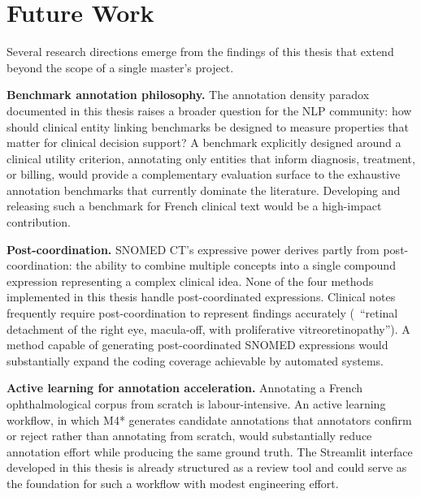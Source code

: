 \section{Future Work}

Several research directions emerge from the findings of this thesis that extend beyond the scope of a single master's project.

\textbf{Benchmark annotation philosophy.} The annotation density paradox documented in this thesis raises a broader question for the NLP community: how should clinical entity linking benchmarks be designed to measure properties that matter for clinical decision support? A benchmark explicitly designed around a clinical utility criterion, annotating only entities that inform diagnosis, treatment, or billing, would provide a complementary evaluation surface to the exhaustive annotation benchmarks that currently dominate the literature. Developing and releasing such a benchmark for French clinical text would be a high-impact contribution.

\textbf{Post-coordination.} SNOMED CT's expressive power derives partly from post-coordination: the ability to combine multiple concepts into a single compound expression representing a complex clinical idea. None of the four methods implemented in this thesis handle post-coordinated expressions. Clinical notes frequently require post-coordination to represent findings accurately (\eg\ ``retinal detachment of the right eye, macula-off, with proliferative vitreoretinopathy''). A method capable of generating post-coordinated SNOMED expressions would substantially expand the coding coverage achievable by automated systems.

\textbf{Active learning for annotation acceleration.} Annotating a French ophthalmological corpus from scratch is labour-intensive. An active learning workflow, in which M4* generates candidate annotations that annotators confirm or reject rather than annotating from scratch, would substantially reduce annotation effort while producing the same ground truth. The Streamlit interface developed in this thesis is already structured as a review tool and could serve as the foundation for such a workflow with modest engineering effort.

